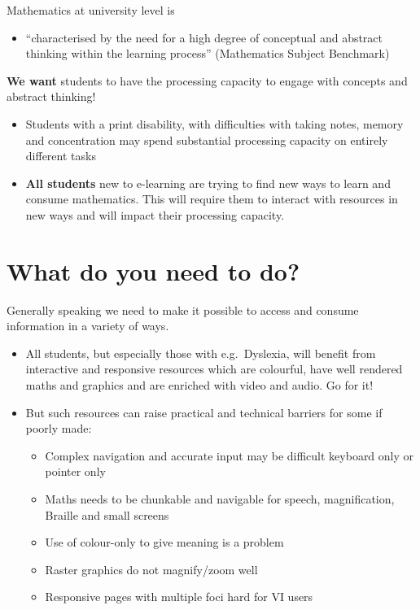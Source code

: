 \documentclass[
  10pt,
  english,
  a4paper]{article}
\providecommand{\tightlist}{%
  \setlength{\itemsep}{0pt}\setlength{\parskip}{0pt}}
\theoremstyle{plain}
\theoremstyle{plain}
\theoremstyle{plain}
\theoremstyle{plain}
\theoremstyle{plain}
\theoremstyle{definition}
\theoremstyle{definition}
\theoremstyle{definition}
\theoremstyle{remark}
\begin{document}
Mathematics at university level is

\begin{itemize}
\tightlist
\item
  ``characterised by the need for a high degree of conceptual and abstract thinking within the learning process'' (Mathematics Subject Benchmark)
\end{itemize}

\textbf{We want} students to have the processing capacity to engage with concepts and abstract thinking!

\begin{itemize}
\item
  Students with a print disability, with difficulties with taking notes, memory and concentration may spend substantial processing capacity on entirely different tasks
\item
  \textbf{All students} new to e-learning are trying to find new ways to learn and consume mathematics. This will require them to interact with resources in new ways and will impact their processing capacity.
\end{itemize}

\hypertarget{what-do-you-need-to-do}{%
\section{What do you need to do?}\label{what-do-you-need-to-do}}

Generally speaking we need to make it possible to access and consume information in a variety of ways.

\begin{itemize}
\tightlist
\item
  All students, but especially those with e.g.~Dyslexia, will benefit from interactive and responsive resources which are colourful, have well rendered maths and graphics and are enriched with video and audio. Go for it!
\item
  But such resources can raise practical and technical barriers for some if poorly made:

  \begin{itemize}
  \tightlist
  \item
    Complex navigation and accurate input may be difficult keyboard only or pointer only
  \item
    Maths needs to be chunkable and navigable for speech, magnification, Braille and small screens
  \item
    Use of colour-only to give meaning is a problem
  \item
    Raster graphics do not magnify/zoom well
  \item
    Responsive pages with multiple foci hard for VI users
  \end{itemize}
\end{itemize}
\end{document}
